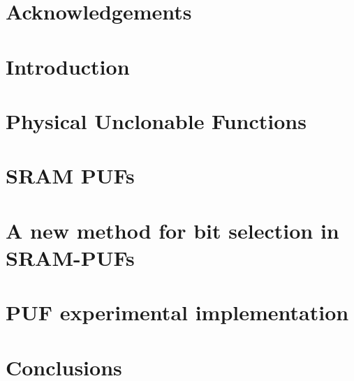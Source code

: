 \documentclass[
    12pt,
    twoside, 
    ]{report}
\author{Andrés Santana Andreo}
\date{15. July 2019}
\begin{document}
\newcommand{\longstring}[1]{{\ttfamily\seqsplit{#1}}}
\thispagestyle{empty}
\maketitle
\chapter*{Acknowledgements}

\tableofcontents{\small}
\listoffigures
\listoftables


\chapter{Introduction}

\chapter{Physical Unclonable Functions}

\chapter{SRAM PUFs}

\chapter{A new method for bit selection in SRAM-PUFs}

\chapter{PUF experimental implementation}

% 
\chapter{Conclusions}


 

% 
\printbibliography


\clearpage



\clearpage
\end{document}
